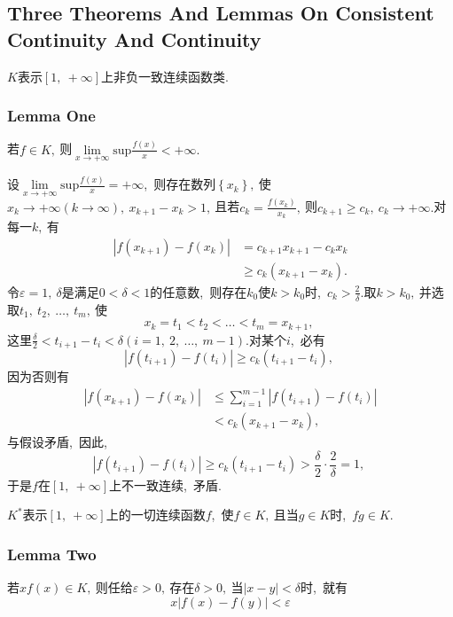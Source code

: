 	\subsection{Three Theorems And Lemmas On Consistent Continuity And Continuity}
	$K$表示$\left[1,\ +\infty\right]$上非负一致连续函数类.
	\subsubsection{Lemma One}
	\begin{problem}
		若$f\in K,\ $则$\lim\limits_{x\rightarrow +\infty}\text{sup}\frac{f(x)}{x}<+\infty.$
	\end{problem}
	
	\begin{solution}
		设$\lim\limits_{x\rightarrow +\infty}\text{sup}\frac{f(x)}{x}=+\infty$,\ 则存在数列$\left\{x_k\right\},\ $使$x_k\rightarrow +\infty(k\rightarrow \infty),\ x_{k+1}-x_k>1,\ $且若$c_k=\frac{f\left(x_k\right)}{x_k},\ $则$c_{k+1}\ge c_k,\ c_k\rightarrow+\infty.$对每一$k,\ $有
		\begin{align*}
			|f(x_{k+1})-f(x_k)|&=c_{k+1}x_{k+1}-c_kx_k\\
			&\ge c_k\left(x_{k+1}-x_k\right).
		\end{align*}
		令$\varepsilon= 1,\ \delta$是满足$0<\delta < 1$的任意数,\ 则存在$k_0$使$k>k_0$时,\ $c_k>\frac{2}{\delta}.$取$k>k_0,\ $并选取$t_1,\ t_2,\ \dots,\ t_m,\ $使
		$$x_k=t_1<t_2<\dots<t_m=x_{k+1},\ $$
		这里$\frac{\delta}{2}<t_{i+1}-t_i<\delta(i=1,\ 2,\ \dots,\ m-1).$对某个$i$,\ 必有
		$$|f(t_{i+1})-f(t_i)|\ge c_k(t_{i+1}-t_i),\ $$
		因为否则有
		\begin{align*}
			|f(x_{k+1})-f(x_k)|&\le \sum\limits_{i=1}^{m-1}|f(t_{i+1})-f(t_i)|\\
			&<c_k\left(x_{k+1}-x_k\right),\ 
		\end{align*}
		与假设矛盾,\ 因此,\ 
		$$|f(t_{i+1})-f(t_i)|\ge c_k(t_{i+1}-t_i)>\frac{\delta}{2}\cdot\frac{2}{\delta}=1,\ $$
		于是$f$在$\left[1,\ +\infty\right]$上不一致连续,\ 矛盾. 
	\end{solution}
	
	$K^*$表示$\left[1,\ +\infty\right]$上的一切连续函数$f$,\ 使$f\in K,\ $且当$g\in K$时,\ $fg\in K.$
	\subsubsection{Lemma Two}
	\begin{problem}
		若$xf(x)\in K,\ $则任给$\varepsilon>0,\ $存在$\delta>0,\ $当$|x-y|<\delta$时,\ 就有
		$$x|f(x)-f(y)|<\varepsilon$$
	\end{problem}
	

